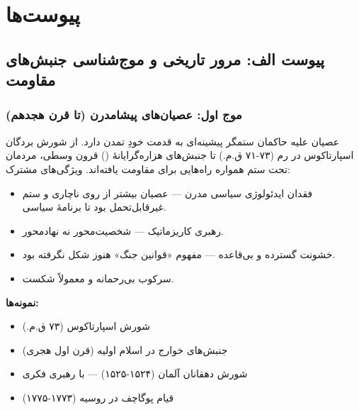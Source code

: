 
\newpage
\appendix

\section*{پیوست‌ها}


\subsection*{پیوست الف: مرور تاریخی و موج‌شناسی جنبش‌های مقاومت}

\subsubsection*{موج اول: عصیان‌های پیشامدرن (تا قرن هجدهم)}

عصیان علیه حاکمان ستمگر پیشینه‌ای به قدمت خودِ تمدن دارد. از شورش 
بردگان اسپارتاکوس در رم (۷۳-۷۱ ق.م.) تا جنبش‌های هزاره‌گرایانهٔ 
() قرون وسطی، مردمان تحت ستم همواره راه‌هایی برای 
مقاومت یافته‌اند. ویژگی‌های مشترک:

\begin{itemize}
\item فقدان ایدئولوژی سیاسی مدرن — عصیان بیشتر از روی ناچاری و 
ستم غیرقابل‌تحمل بود تا برنامهٔ سیاسی.
\item رهبری کاریزماتیک — شخصیت‌محور نه نهادمحور.
\item خشونت گسترده و بی‌قاعده — مفهوم «قوانین جنگ» هنوز شکل نگرفته بود.
\item سرکوب بی‌رحمانه و معمولاً شکست.
\end{itemize}

\textbf{نمونه‌ها:}
\begin{itemize}
\item شورش اسپارتاکوس (۷۳ ق.م.)
\item جنبش‌های خوارج در اسلام اولیه (قرن اول هجری)
\item شورش دهقانان آلمان (۱۵۲۴-۱۵۲۵) — با رهبری فکری 
\item قیام پوگاچف در روسیه (۱۷۷۳-۱۷۷۵)
\end{itemize}

